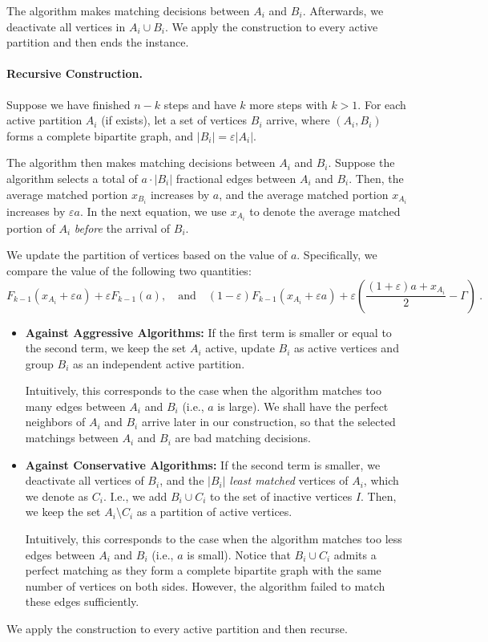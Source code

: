 \documentclass[11pt,letterpaper]{article}
\newcommand{\eps}{\varepsilon}
\begin{document}
The algorithm makes matching decisions between $A_i$ and $B_i$. Afterwards, we deactivate all vertices in $A_i \cup B_i$.
We apply the construction to every active partition and then ends the instance.

\paragraph{Recursive Construction.}
Suppose we have finished $n-k$ steps and have $k$ more steps with $k>1$. For each active partition $A_i$ (if exists), let a set of vertices $B_i$ arrive, where $(A_i,B_i)$ forms a complete bipartite graph, and $|B_i| = \eps |A_i|$. 

The algorithm then makes matching decisions between $A_i$ and $B_i$.
Suppose the algorithm selects a total of $a \cdot |B_i|$ fractional edges between $A_i$ and $B_i$. 
Then, the average matched portion $x_{B_i}$ increases by $a$, and the average matched portion $x_{A_i}$ increases by $\eps a$. In the next equation, we use $x_{A_i}$ to denote the average matched portion of $A_i$ \emph{before} the arrival of $B_i$.
 
We update the partition of vertices based on the value of $a$. Specifically, we compare the value of the following two quantities:
 \[
F_{k-1}(x_{A_i}+\eps a) + \eps F_{k-1}(a), \quad \text{and} \quad (1-\eps) F_{k-1}(x_{A_i}+\eps a)+ \eps \left(\frac{(1+\eps)a + x_{A_i}}{2} - \Gamma \right)~.
 \]
\begin{itemize}
\item {\bf Against Aggressive Algorithms:}
If the first term is smaller or equal to the second term, we keep the set $A_i$ active, update $B_i$ as active vertices and group $B_i$ as an independent active partition.

Intuitively, this corresponds to the case when the algorithm matches too many edges between $A_i$ and $B_i$ (i.e., $a$ is large). We shall have the perfect neighbors of $A_i$ and $B_i$ arrive later in our construction, so that the selected matchings between $A_i$ and $B_i$ are bad matching decisions.

\item {\bf Against Conservative Algorithms:} 
If the second term is smaller, we deactivate all vertices of $B_i$, and the $|B_i|$ \emph{least matched} vertices of $A_i$, which we denote as $C_{i}$. I.e., we add $B_i \cup C_i$ to the set of inactive vertices $I$.
Then, we keep the set $A_i \setminus C_i$ as a partition of active vertices.

Intuitively, this corresponds to the case when the algorithm matches too less edges between $A_i$ and $B_i$ (i.e., $a$ is small).
Notice that $B_i \cup C_i$ admits a perfect matching as they form a complete bipartite graph with the same number of vertices on both sides. However, the algorithm failed to match these edges sufficiently. 
\end{itemize}
We apply the construction to every active partition and then recurse.
\end{document}
